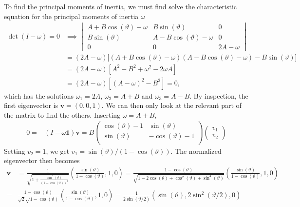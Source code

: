 \documentclass{article}
\begin{document}
        To find the principal moments of inertia, we must find solve the characteristic equation for the principal moments of inertia $\omega$
        \begin{align*}
             \det(I - \omega) = 0& \implies
            \begin{vmatrix*}
                A + B\cos(\vartheta) - \omega & B \sin(\vartheta) & 0 \\
                B \sin(\vartheta) & A - B\cos(\vartheta) - \omega & 0 \\
                0 & 0 & 2A - \omega
            \end{vmatrix*} \\
            &= (2A - \omega) \big[(A + B\cos(\vartheta) - \omega) (A - B\cos(\vartheta) - \omega)  - B \sin(\vartheta) \big]  \\
            &= (2A - \omega)[A^2 - B^2 + \omega^2 - 2\omega A] \\
            &= (2A - \omega)[(A - \omega)^2 - B^2] = 0,
        \end{align*}
        which has the solutions $\omega_1 = 2A, \, \omega_2 = A+B$ and $\omega_3 = A-B$. By inspection, the first eigenvector is $\mathbf{v} = (0, 0, 1)$. We can then only look at the relevant part of the matrix to find the others. Inserting $\omega = A + B $,
        \begin{align*}
            0 = & (I - \omega \mathbb{1}) \mathbf{v} = B
            \begin{pmatrix*}
                \cos(\vartheta) - 1 & \sin(\vartheta)  \\
                \sin(\vartheta) & -\cos(\vartheta)-1  \\
            \end{pmatrix*} 
            \begin{pmatrix*}
                v_1 \\
                v_2 
            \end{pmatrix*}
        \end{align*}
        Setting $v_2 = 1$, we get $v_1 = \sin(\vartheta) / (1 - \cos(\vartheta))$. The normalized eigenvector then becomes
        \begin{align*}
            \mathbf{v} &= \frac{1}{\sqrt{1 + \frac{\sin^2(\vartheta)}{(1 - \cos(\vartheta))^2}}} \left( \frac{\sin(\vartheta)}{1 - \cos(\vartheta)}, 1, 0 \right)
            = \frac{1 - \cos(\vartheta)}{\sqrt{1 - 2 \cos(\theta) + \cos^2(\vartheta)  + \sin^2(\vartheta)}}\left( \frac{\sin(\vartheta)}{1 - \cos(\vartheta)}, 1, 0 \right) \\
            = &\frac{1 - \cos(\vartheta)}{\sqrt 2 \sqrt{1 - \cos(\vartheta) } }\left( \frac{\sin(\vartheta)}{1 - \cos(\vartheta)}, 1, 0 \right) 
            = \frac{1}{2  \sin(\vartheta/2) }\left( \sin(\vartheta), 2\sin^2(\vartheta / 2), 0 \right) 
        \end{align*}
\end{document}

